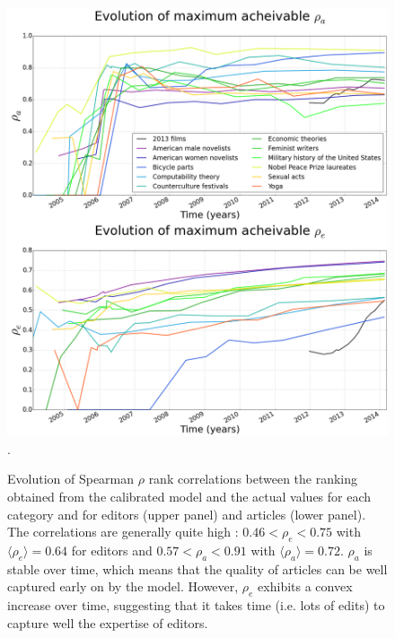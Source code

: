 \begin{figure}[!t]
\centering

\includegraphics[width=0.9\columnwidth]{../Figures/rho_combined.png}.
\caption{Evolution of Spearman $\rho$ rank correlations between the ranking obtained from the calibrated model and the actual values for each category and for editors (upper panel)  and articles (lower panel). The correlations are generally quite high : $ 0.46 < \rho_e < 0.75$ with $\langle \rho_e\rangle = 0.64$ for editors and $0.57 < \rho_a < 0.91$ with $\langle \rho_a\rangle = 0.72$. $\rho_{a}$  is stable over time, which means that the quality of articles can be well captured early on by the model. However, $\rho_e$ exhibits a convex increase over time, suggesting that it takes time (i.e. lots of edits) to capture well the expertise of editors.}
\label{fig:rhotime}


\end{figure}
